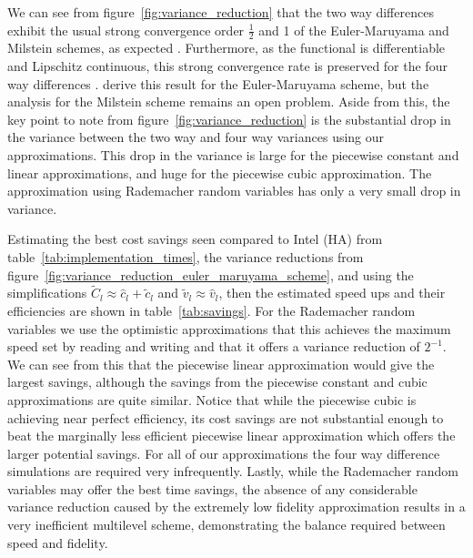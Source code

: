 \documentclass[manuscript,review]{acmart}
\begin{document}
We can see from figure~\ref{fig:variance_reduction} that the two way differences exhibit the usual strong convergence order $ \tfrac{1}{2} $ and 1 of the Euler-Maruyama and Milstein schemes, as expected \citep{kloeden1999numerical}. Furthermore, as the functional is differentiable and Lipschitz continuous, this strong convergence rate is preserved for the four way differences \citep{giles2020approximate,sheridan2020nested}. \citeauthor{giles2020approximate} \citep{giles2020approximate,sheridan2020nested} derive this result for the Euler-Maruyama scheme, but the analysis for the Milstein scheme remains an open problem. Aside from this, the key point to note from figure~\ref{fig:variance_reduction} is the substantial drop in the variance between the two way and four way variances using our approximations. This drop in the variance is large for the piecewise constant and linear approximations, and huge for the piecewise cubic approximation. The approximation using Rademacher random variables has only a very small drop in variance. 

Estimating the best cost savings seen compared to Intel (HA) from table~\ref{tab:implementation_times}, the variance reductions from figure~\ref{fig:variance_reduction_euler_maruyama_scheme}, and using the simplifications $ \widetilde{C}_l \approx \hat{c}_l + \tilde{c}_l $ and $ \tilde{v}_l \approx  \hat{v}_l $, then the estimated speed ups and their efficiencies are shown in table~\ref{tab:savings}. For the Rademacher random variables we use the optimistic  approximations that this achieves the maximum speed set by reading and writing and that it offers a variance reduction of $ 2^{-1} $. We can see from this that the piecewise linear approximation would give the largest savings, although the savings from the piecewise constant and cubic approximations are quite similar. Notice that while the piecewise cubic is achieving near perfect efficiency, its cost savings are not substantial enough to beat the marginally less efficient piecewise linear approximation which offers the larger potential savings. For all of our approximations the four way difference simulations are required very infrequently. Lastly, while the Rademacher random variables may offer the best time savings, the absence of any considerable variance reduction caused by the extremely low fidelity approximation results in a very inefficient multilevel scheme, demonstrating the balance required between speed and fidelity. 
\end{document}
